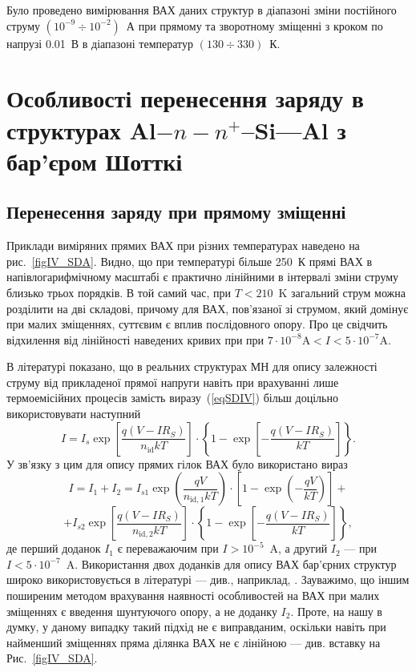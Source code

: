 Було проведено вимірювання ВАХ даних структур в діапазоні зміни постійного струму $(10^{-9}\div10^{-2})$~А при
прямому та зворотному зміщенні з кроком по напрузі 0.01~В в діапазоні температур $(130\div330)$~К.


\section{Особливості перенесення заряду в структурах Al$-n-n^+$--Si---Al з бар'єром Шотткі\label{MSSi_Non}}
\subsection{Перенесення заряду при прямому зміщенні\label{sbMSSi_NonF}}


Приклади виміряних прямих ВАХ при різних температурах наведено на рис.~\ref{figIV_SDA}.
Видно, що при температурі більше 250~К прямі ВАХ в напівлогарифмічному масштабі є практично лінійними в інтервалі зміни струму близько трьох порядків.
В той самий час, при $T<210$~K загальний струм можна розділити на дві складові, причому для ВАХ, пов'язаної зі струмом,
який домінує при малих зміщеннях, суттєвим є вплив послідовного опору.
Про це свідчить відхилення від лінійності наведених кривих при при $7\cdot10^{-8}\mbox{A}<I<5\cdot10^{-7}\mbox{A}$.

В літературі \cite{Rhoderick1988,Gromov,Sze2012} показано, що в реальних структурах МН для опису залежності струму від прикладеної прямої напруги
навіть при врахуванні лише термоемісійних процесів замість виразу~(\ref{eqSDIV}) більш доцільно використовувати наступний
\begin{equation}
\label{eqSDIV:2}
I=I_s\exp\left[\frac{q(V-IR_S)}{n_\mathrm{id}kT}\right]\cdot
\left\{1-\exp\left[-\frac{q(V-IR_S)}{kT}\right]\right\}.
\end{equation}
У зв'язку з цим для опису прямих гілок ВАХ було використано вираз
\[
I=I_1+I_2=I_{s1}\exp{\left(\frac{qV}{n_{\mathrm{id},1}kT}\right)}\cdot
\left[1-\exp{\left(-\frac{qV}{kT}\right)}\right]+\]
\begin{equation} \label{eqSDA_IV}
+I_{s2}\exp\left[\frac{q(V-IR_S)}{n_{\mathrm{id},2}kT}\right]\cdot
\left\{1-\exp\left[-\frac{q(V-IR_S)}{kT}\right]\right\},
\end{equation}
де перший доданок $I_1$ є переважаючим при $I>10^{-5}$~A, а другий $I_2$ --- при $I<5\cdot10^{-7}$~A.
Використання двох доданків для опису ВАХ бар'єрних структур широко використовується
в літературі --- див., наприклад, \cite{Arslan,Donoval2010,Huang,GELCZUK2014}.
Зауважимо, що іншим поширеним методом врахування наявності особливостей на ВАХ при малих зміщеннях є введення шунтуючого опору, а не доданку $I_2$.
Проте, на нашу в думку, у даному випадку такий підхід не є виправданим, оскільки навіть при найменший зміщеннях пряма ділянка ВАХ не є лінійною --- див. вставку на Рис.~\ref{figIV_SDA}.

